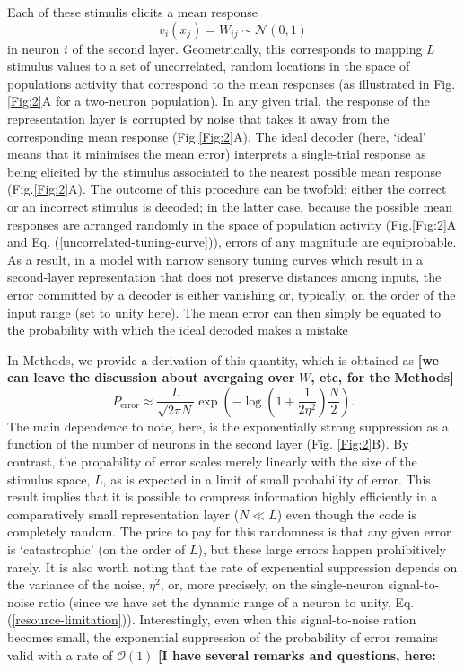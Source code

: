 \documentclass[a4paper]{article}%
\begin{document}
Each of these stimulis elicits a mean response
\begin{equation}
v_{i}(x_{j})=W_{ij}\sim\mathcal{N}(0,1)\label{uncorrelated-tuning-curve}%
\end{equation}
in neuron $i$ of the second layer. Geometrically, this corresponds to mapping
$L$ stimulus values to a set of uncorrelated, random locations in the space of
populations activity that correspond to the mean responses (as illustrated in
Fig.\ref{Fig:2}A for a two-neuron population). In any given trial, the
response of the representation layer is corrupted by noise that takes it away
from the corresponding mean response (Fig.\ref{Fig:2}A). The ideal decoder
(here, `ideal' means that it minimises the mean error) interprets a
single-trial response as being elicited by the stimulus associated to the
nearest possible mean response (Fig.\ref{Fig:2}A). The outcome of this
procedure can be twofold: either the correct or an incorrect stimulus is
decoded; in the latter case, because the possible mean responses are arranged
randomly in the space of population activity (Fig.\ref{Fig:2}A and Eq.
(\ref{uncorrelated-tuning-curve})), errors of any magnitude are equiprobable.
As a result, in a model with narrow sensory tuning curves which result in a
second-layer representation that does not preserve distances among inputs, the
error committed by a decoder is either vanishing or, typically, on the order
of the input range (set to unity here). The mean error can then simply be
equated to the probability with which the ideal decoded makes a mistake

In Methods, we provide a derivation of this quantity, which is obtained as
\textbf{[we can leave the discussion about avergaing over }$W$\textbf{, etc,
for the Methods]}%
\begin{equation}
P_{\text{error}}\approx\frac{L}{\sqrt{2\pi N}}\exp\left(  -{\log}\left(
{1+\frac{1}{2\eta^{2}}}\right)  {\frac{N}{2}}\right)  .\label{Eq:PGE}%
\end{equation}
The main dependence to note, here, is the exponentially strong suppression as
a function of the number of neurons in the second layer (Fig. \ref{Fig:2}B).
By contrast, the propability of error scales merely linearly with the size of
the stimulus space, $L$, as is expected in a limit of small probability of
error. This result implies that it is possible to compress information highly
efficiently in a comparatively small representation layer ($N\ll L$) even
though the code is completely random. The price to pay for this randomness is
that any given error is `catastrophic' (on the order of $L$), but these large
errors happen prohibitively rarely. It is also worth noting that the rate of
expenential suppression depends on the variance of the noise, $\eta^{2}$, or,
more precisely, on the single-neuron signal-to-noise ratio (since we have set
the dynamic range of a neuron to unity, Eq. (\ref{resource-limitation})).
Interestingly, even when this signal-to-noise ration becomes small, the
exponential suppression of the probability of error remains valid with a rate
of $\mathcal{O}\left(  1\right)  $ \textbf{[I have several remarks and
questions, here:}
\end{document}
